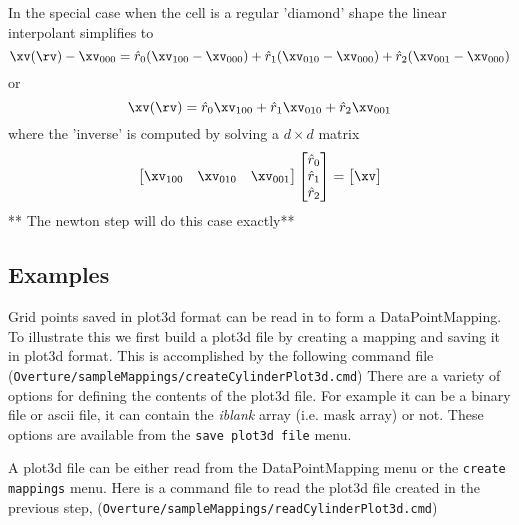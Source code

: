 In the special case when the cell is a regular 'diamond' shape the linear interpolant simplifies to
\[
   \xv(\rv)-\xv_{000} = \rh_0 ( \xv_{100}-\xv_{000} ) + \rh_1 ( \xv_{010}-\xv_{000} )+ \rh_2 ( \xv_{001}-\xv_{000} )
\]
or
\[
   \xv(\rv) = \rh_0 \xv_{100} + \rh_1 \xv_{010} + \rh_2 \xv_{001}
\]
where the 'inverse' is computed by solving a $d\times d$ matrix
\[
   \begin{bmatrix} \xv_{100} & \xv_{010} & \xv_{001} \end{bmatrix}
   \begin{bmatrix} \rh_0 \\ \rh_1 \\ \rh_2  \end{bmatrix} =
   \begin{bmatrix} \xv   \end{bmatrix}
\]
** The newton step will do this case exactly**




\subsection{Examples}


Grid points saved in plot3d format can be read in to form a DataPointMapping.
To illustrate this we first build a plot3d file by creating a mapping and
saving it in plot3d format. This is accomplished by the following
command file ({\tt Overture/sampleMappings/createCylinderPlot3d.cmd})
{\footnotesize
{}
}
There are a variety of options for defining the contents of the plot3d file. For example
it can be a binary file or ascii file, it can contain the {\em iblank} array (i.e. mask array) or not.
These options are available from the {\tt save plot3d file} menu.


A plot3d file can be either read from the DataPointMapping menu or the
{\tt create mappings} menu. Here is a command file to read the plot3d file 
created in the previous step, ({\tt Overture/sampleMappings/readCylinderPlot3d.cmd})
{\footnotesize
{}
}





